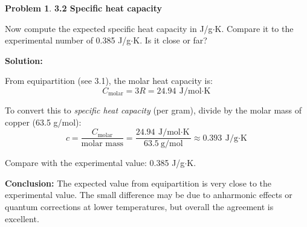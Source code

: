 \documentclass[12pt]{article}
\theoremstyle{definition} %
\newtheorem{problem}{Problem}
\theoremstyle{plain} %
\begin{document}
\begin{problem}
    \textbf{3.2 Specific heat capacity}

    Now compute the expected specific heat capacity in J/g$\cdot$K. Compare it to the experimental number of 0.385 J/g$\cdot$K. Is it close or far?

    \textbf{Solution:}

    From equipartition (see 3.1), the molar heat capacity is:
    \[
        C_{\text{molar}} = 3R = 24.94\ \text{J/mol$\cdot$K}
    \]

    To convert this to \emph{specific heat capacity} (per gram), divide by the molar mass of copper (63.5 g/mol):
    \[
        c = \frac{C_{\text{molar}}}{\text{molar mass}} = \frac{24.94\ \text{J/mol$\cdot$K}}{63.5\ \text{g/mol}} \approx 0.393\ \text{J/g$\cdot$K}
    \]

    Compare with the experimental value: 0.385 J/g$\cdot$K.

    \textbf{Conclusion:} The expected value from equipartition is very close to the experimental value. The small difference may be due to anharmonic effects or quantum corrections at lower temperatures, but overall the agreement is excellent.
\end{problem}
\end{document}

